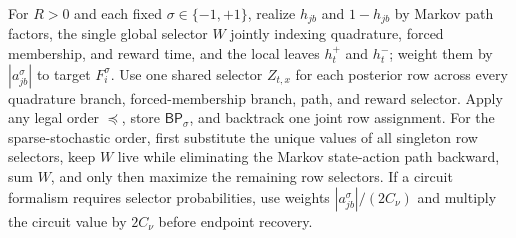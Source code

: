 For \(R>0\) and each fixed \(\sigma\in\{-1,+1\}\), realize \(h_{jb}\) and \(1-h_{jb}\) by Markov path factors, the single global selector \(W\) jointly indexing quadrature, forced membership, and reward time, and the local leaves \(h_t^{+}\) and \(h_t^{-}\); weight them by \(|a_{jb}^{\sigma}|\) to target \(F_i^{\sigma}\). Use one shared selector \(Z_{t,x}\) for each posterior row across every quadrature branch, forced-membership branch, path, and reward selector. Apply any legal order \(\preceq\), store \(\mathsf{BP}_{\sigma}\), and backtrack one joint row assignment. For the sparse-stochastic order, first substitute the unique values of all singleton row selectors, keep \(W\) live while eliminating the Markov state-action path backward, sum \(W\), and only then maximize the remaining row selectors. If a circuit formalism requires selector probabilities, use weights \(|a_{jb}^{\sigma}|/(2C_{\nu})\) and multiply the circuit value by \(2C_{\nu}\) before endpoint recovery.